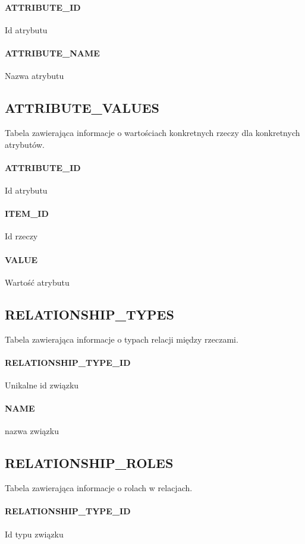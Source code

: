 \documentclass[a4paper, oneside, 11pt]{report}
\begin{document}
\paragraph{ATTRIBUTE\_ID} Id atrybutu
\paragraph{ATTRIBUTE\_NAME} Nazwa atrybutu

\subsection{ATTRIBUTE\_VALUES}

Tabela zawierająca informacje o wartościach konkretnych rzeczy dla konkretnych atrybutów.

\paragraph{ATTRIBUTE\_ID} Id atrybutu
\paragraph{ITEM\_ID} Id rzeczy
\paragraph{VALUE} Wartość atrybutu

\subsection{RELATIONSHIP\_TYPES}

Tabela zawierająca informacje o typach relacji między rzeczami.

\paragraph{RELATIONSHIP\_TYPE\_ID} Unikalne id związku
\paragraph{NAME} nazwa związku

\subsection{RELATIONSHIP\_ROLES}

Tabela zawierająca informacje o rolach w relacjach.

\paragraph{RELATIONSHIP\_TYPE\_ID} Id typu związku
\end{document}
